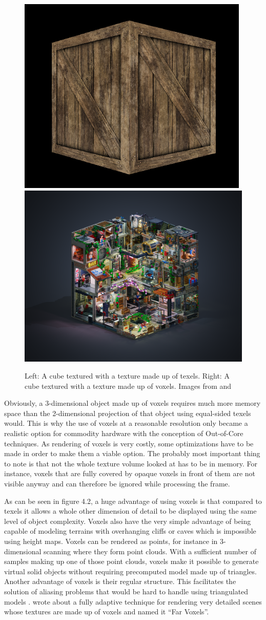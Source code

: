 \begin{figure}[h]
  \begin{center}
    \includegraphics[width=.4\textwidth]{logos/texel_textured_cube.png}
    \hfill
    \includegraphics[width=.44\textwidth]{logos/voxel_textured_cube.png}
    \caption{Left: A cube textured with a texture made up of texels. Right: A cube textured with a texture made up of voxels. Images from \cite{Bej:OpenGLEx} and \cite{Ing:VoxPeop}}
  \end{center}
\end{figure}

Obviously, a 3-dimensional object made up of voxels requires much more memory space than the 2-dimensional projection of that object using equal-sided texels would. This is why the use of voxels at a reasonable resolution only became a realistic option for commodity hardware with the conception of Out-of-Core techniques. As rendering of voxels is very costly, some optimizations have to be made in order to make them a viable option. The probably most important thing to note is that not the whole texture volume looked at has to be in memory. For instance, voxels that are fully covered by opaque voxels in front of them are not visible anyway and can therefore be ignored while processing the frame.

As can be seen in figure 4.2, a huge advantage of using voxels is that compared to texels it allows a whole other dimension of detail to be displayed using the same level of object complexity. Voxels also have the very simple advantage of being capable of modeling terrains with overhanging cliffs or caves which is impossible using height maps. Voxels can be rendered as points, for instance in 3-dimensional scanning where they form point clouds.	With a sufficient number of samples making up one of those point clouds, voxels make it possible to generate virtual solid objects without requiring precomputed model made up of triangles. Another advantage of voxels is their regular structure. This facilitates the solution of aliasing problems that would be hard to handle using triangulated models \cite{Crassin:2009:GRS:1507149.1507152}. \cite{Gobbetti:2005:FVM:1073204.1073277} wrote about a fully adaptive technique for rendering very detailed scenes whose textures are made up of voxels and named it ``Far Voxels''.

